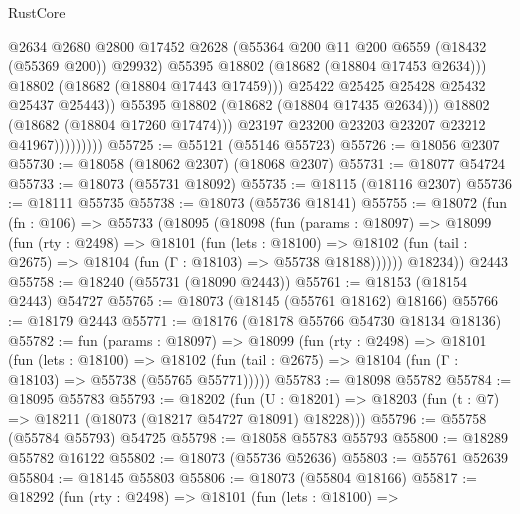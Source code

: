 \begin{lexlean}{RustCore}
\begin{coremodule}
                                  @2634
                                  @2680
                                  @2800
                                  @17452
                                  @2628
                                  (@55364 @200 @11 @200 @6559 (@18432 (@55369 @200)) @29932)
                                  @55395
                                  @18802
                                  (@18682 (@18804 @17453 @2634)))
                                @18802
                                (@18682 (@18804 @17443 @17459)))
                              @25422
                              @25425
                              @25428
                              @25432
                              @25437
                              @25443))
                          @55395
                          @18802
                          (@18682 (@18804 @17435 @2634)))
                        @18802
                        (@18682 (@18804 @17260 @17474)))
                      @23197
                      @23200
                      @23203
                      @23207
                      @23212
                      @41967)))))))))
@55725 := @55121 (@55146 @55723)
@55726 := @18056 @2307
@55730 := @18058 (@18062 @2307) (@18068 @2307)
@55731 := @18077 @54724
@55733 := @18073 (@55731 @18092)
@55735 := @18115 (@18116 @2307)
@55736 := @18111 @55735
@55738 := @18073 (@55736 @18141)
@55755 := @18072
    (fun (fn : @106) =>
    @55733
      (@18095
        (@18098
          (fun (params : @18097) =>
          @18099
            (fun (rty : @2498) =>
            @18101
              (fun (lets : @18100) =>
              @18102 (fun (tail : @2675) => @18104 (fun (Γ : @18103) => @55738 @18188))))))
        @18234))
    @2443
@55758 := @18240 (@55731 (@18090 @2443))
@55761 := @18153 (@18154 @2443) @54727
@55765 := @18073 (@18145 (@55761 @18162) @18166)
@55766 := @18179 @2443
@55771 := @18176 (@18178 @55766 @54730 @18134 @18136)
@55782 := fun (params : @18097) =>
  @18099
    (fun (rty : @2498) =>
    @18101
      (fun (lets : @18100) =>
      @18102 (fun (tail : @2675) => @18104 (fun (Γ : @18103) => @55738 (@55765 @55771)))))
@55783 := @18098 @55782
@55784 := @18095 @55783
@55793 := @18202
    (fun (U : @18201) => @18203 (fun (t : @7) => @18211 (@18073 (@18217 @54727 @18091) @18228)))
@55796 := @55758 (@55784 @55793) @54725
@55798 := @18058 @55783 @55793
@55800 := @18289 @55782 @16122
@55802 := @18073 (@55736 @52636)
@55803 := @55761 @52639
@55804 := @18145 @55803
@55806 := @18073 (@55804 @18166)
@55817 := @18292
    (fun (rty : @2498) =>
    @18101
      (fun (lets : @18100) =>

\end{coremodule}
\end{lexlean}
